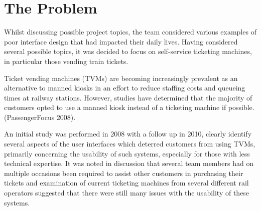 \section{The Problem}
Whilst discussing possible project topics, the team considered various examples of poor interface design  that had impacted their daily lives. Having considered several possible topics, it was decided to focus on self-service ticketing machines, in particular those vending train tickets.
 
Ticket vending machines (TVMs) are becoming increasingly prevalent as an alternative to manned kiosks in an effort to reduce staffing costs and queueing times at railway stations. However, studies have determined that the majority of customers opted to use a manned kiosk instead of a ticketing machine if possible. (PassengerFocus 2008). 




An initial study was performed in 2008 with a follow up in 2010,  clearly identify several aspects of the user interfaces which deterred customers from using TVMs, primarily concerning the usability of such systems, especially for those with less technical expertise. It was noted in discussion that several team members had on multiple occasions been required to assist other customers in purchasing their tickets and examination of current ticketing machines from several different rail operators suggested that there were still many issues with the usability of these systems.  
 
